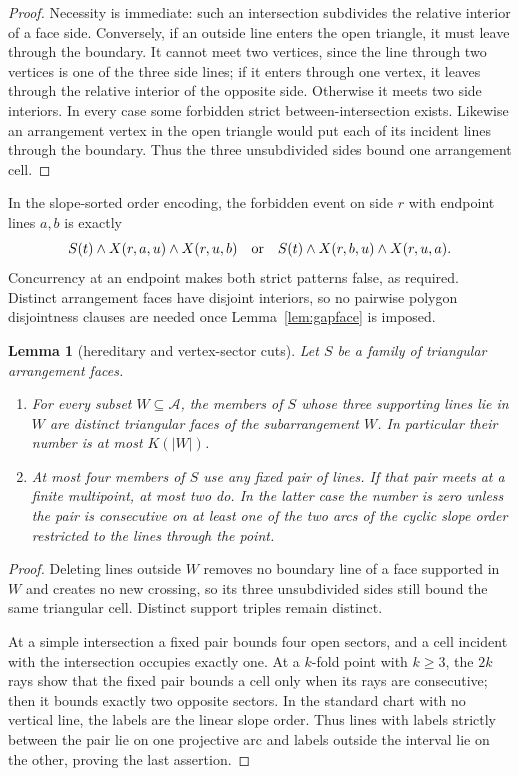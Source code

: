 \documentclass[11pt]{article}
\newtheorem{lemma}[theorem]{Lemma}
\theoremstyle{definition}
\begin{document}
\begin{proof}
Necessity is immediate: such an intersection subdivides the relative interior
of a face side. Conversely, if an outside line enters the open triangle, it
must leave through the boundary. It cannot meet two vertices, since the line
through two vertices is one of the three side lines; if it enters through one
vertex, it leaves through the relative interior of the opposite side.
Otherwise it meets two side interiors. In every case some forbidden strict
between-intersection exists. Likewise an arrangement vertex in the open
triangle would put each of its incident lines through the boundary. Thus the
three unsubdivided sides bound one arrangement cell.
\end{proof}

In the slope-sorted order encoding, the forbidden event on side $r$ with
endpoint lines $a,b$ is exactly
\[
 S(t)\wedge X(r,a,u)\wedge X(r,u,b)
 \quad\hbox{or}\quad
 S(t)\wedge X(r,b,u)\wedge X(r,u,a).
\]
Concurrency at an endpoint makes both strict patterns false, as required.
Distinct arrangement faces have disjoint interiors, so no pairwise polygon
disjointness clauses are needed once Lemma~\ref{lem:gapface} is imposed.

\begin{lemma}[hereditary and vertex-sector cuts]\label{lem:hereditary}
Let $S$ be a family of triangular arrangement faces.
\begin{enumerate}
\item For every subset $W\subseteq\mathcal A$, the members of $S$ whose three
supporting lines lie in $W$ are distinct triangular faces of the
subarrangement $W$. In particular their number is at most $K(|W|)$.
\item At most four members of $S$ use any fixed pair of lines. If that pair
meets at a finite multipoint, at most two do. In the latter case the number is
zero unless the pair is consecutive on at least one of the two arcs of the
cyclic slope order restricted to the lines through the point.
\end{enumerate}
\end{lemma}

\begin{proof}
Deleting lines outside $W$ removes no boundary line of a face supported in
$W$ and creates no new crossing, so its three unsubdivided sides still bound
the same triangular cell. Distinct support triples remain distinct.

At a simple intersection a fixed pair bounds four open sectors, and a cell
incident with the intersection occupies exactly one. At a $k$-fold point with
$k\ge3$, the $2k$ rays show that the fixed pair bounds a cell only when its
rays are consecutive; then it bounds exactly two opposite sectors. In the
standard chart with no vertical line, the labels are the linear slope order.
Thus lines with labels strictly between the pair lie on one projective arc
and labels outside the interval lie on the other, proving the last assertion.
\end{proof}
\end{document}
